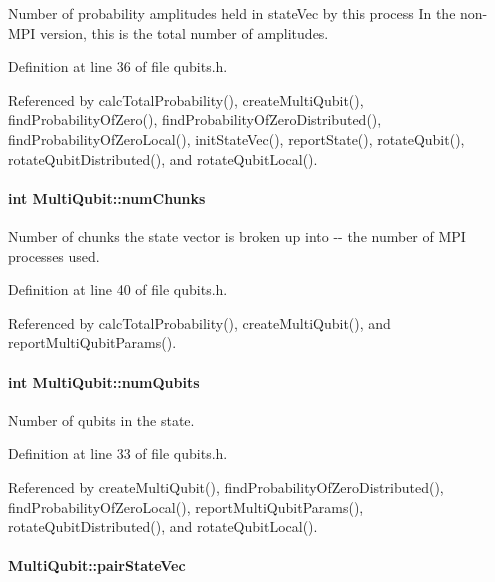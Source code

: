 Number of probability amplitudes held in stateVec by this process In the non-\/MPI version, this is the total number of amplitudes. 

Definition at line 36 of file qubits.h.

Referenced by calcTotalProbability(), createMultiQubit(), findProbabilityOfZero(), findProbabilityOfZeroDistributed(), findProbabilityOfZeroLocal(), initStateVec(), reportState(), rotateQubit(), rotateQubitDistributed(), and rotateQubitLocal().\hypertarget{structMultiQubit_acd43f2f57991709c9e94f73662c972b2}{
\paragraph[{numChunks}]{\setlength{\rightskip}{0pt plus 5cm}int {\bf MultiQubit::numChunks}}\hfill}
\label{structMultiQubit_acd43f2f57991709c9e94f73662c972b2}


Number of chunks the state vector is broken up into -\/-\/ the number of MPI processes used. 

Definition at line 40 of file qubits.h.

Referenced by calcTotalProbability(), createMultiQubit(), and reportMultiQubitParams().\hypertarget{structMultiQubit_ab5b9795bdc6fb5855e1974dcbbaeb36f}{
\paragraph[{numQubits}]{\setlength{\rightskip}{0pt plus 5cm}int {\bf MultiQubit::numQubits}}\hfill}
\label{structMultiQubit_ab5b9795bdc6fb5855e1974dcbbaeb36f}


Number of qubits in the state. 

Definition at line 33 of file qubits.h.

Referenced by createMultiQubit(), findProbabilityOfZeroDistributed(), findProbabilityOfZeroLocal(), reportMultiQubitParams(), rotateQubitDistributed(), and rotateQubitLocal().\hypertarget{structMultiQubit_a76f7db4eab52d2b30f58f973ada809c5}{
\paragraph[{pairStateVec}]{ {\bf MultiQubit::pairStateVec}}\hfill}
\label{structMultiQubit_a76f7db4eab52d2b30f58f973ada809c5}


